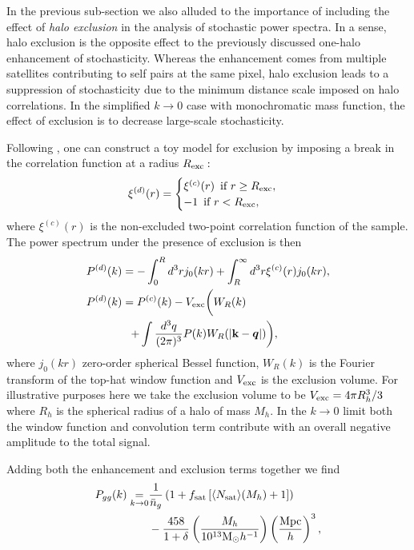 \documentclass[fleqn,usenatbib]{mnras}
\newcommand{\bq}{\boldsymbol q}
\newcommand{\bk}{\textbf{k}}
\begin{document}
In the previous sub-section we also alluded to the importance of including the effect of \emph{halo exclusion} in the analysis of stochastic power spectra. In a sense, halo exclusion is the opposite effect to the previously discussed one-halo enhancement of stochasticity. Whereas the enhancement comes from multiple satellites contributing to self pairs at the same pixel, halo exclusion leads to a suppression of stochasticity due to the minimum distance scale imposed on halo correlations. In the simplified $k\to 0$ case with monochromatic mass function, the effect of exclusion is to decrease large-scale stochasticity. \par 
Following \cite{Baldauf_2013}, one can construct a toy model for exclusion by imposing a break in the correlation function at a radius $R_{\rm exc}:$
\begin{equation}
    \xi^{(d)}(r) = \begin{cases}
                    \xi^{(c)}(r) \, \text{ if }r \geq R_{\rm exc}, \\
                    -1  \, \text{ if }r < R_{\rm exc}, \\
                    \end{cases}
\end{equation}  
where $\xi^{(c)}(r)$ is the non-excluded two-point correlation function of the sample. The power spectrum under the presence of exclusion is then 
\begin{align}
    &P^{(d)}(k) = -\int_0^R d^3r j_0 (kr) + \int_R^\infty d^3r \xi^{(c)} (r) j_0(kr), \\
   \nonumber{} &P^{(d)}(k) = P^{(c)}(k)- V_{\rm exc} \biggl ( W_R(k) \biggr. \\
  \label{eqn:exclusion}&\biggl.\quad \quad\quad\quad+ \int \frac{d^3 q}{(2\pi)^3} P(k) W_R (|\bk - \bq|) \biggr),
\end{align}
where $j_0 (kr)$ zero-order spherical Bessel function, $W_R (k)$ is the Fourier transform of the top-hat window function and $V_{\rm exc}$ is the exclusion volume. For illustrative purposes here we take the exclusion volume to be $V_{\rm exc} = 4\pi R_h^3 / 3$ where $R_h$ is the spherical radius of a halo of mass $M_h$. In the $k\to 0$ limit  both the window function and convolution term contribute with an overall negative amplitude to the total signal. \par 
Adding both the enhancement and exclusion terms together we find
\begin{align}
\label{eqn:finalform}
P_{gg} (k) \underset{k \to 0}{=} &\frac{1}{\bar{n}_g} \left ( 1 +  f_{\rm sat} \left [ \langle N_{\rm sat} \rangle (M_h) + 1 \right ] \right)\\
\nonumber &- \frac{458}{1+\delta} \left ( \frac{M_h}{10^{13} {\rm M}_\odot h^{-1}} \right) \left ( \frac{\rm Mpc}{h} \right)^3, 
\end{align}
\end{document}
